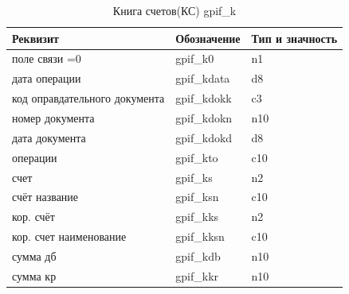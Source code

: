 \begin{table}[h!p]
    \centering
    \scriptsize
    \caption{Книга счетов(КС) gpif\_k}
    \begin{tabular}{|l|l|l|} 

                                                                                       \hline
\textbf{Реквизит}               &\textbf{Обозначение}   &\textbf{Тип и значность}   \\ \hline
поле связи  =0                  &gpif\_k0                &n1                         \\ \hline
дата операции                   &gpif\_kdata             &d8                         \\ \hline
код оправдательного документа   &gpif\_kdokk             &c3                         \\ \hline
номер документа                 &gpif\_kdokn             &n10                        \\ \hline
дата документа                  &gpif\_kdokd             &d8                         \\ \hline
операции                        &gpif\_kto               &c10                        \\ \hline
счет                            &gpif\_ks                &n2                         \\ \hline
счёт название                   &gpif\_ksn               &c10                        \\ \hline
кор. счёт                       &gpif\_kks               &n2                         \\ \hline
кор. счет наименование          &gpif\_kksn              &c10                        \\ \hline
сумма дб                        &gpif\_kdb               &n10                        \\ \hline
сумма кр                        &gpif\_kkr               &n10                        \\ \hline

    \end{tabular}
\end{table}

